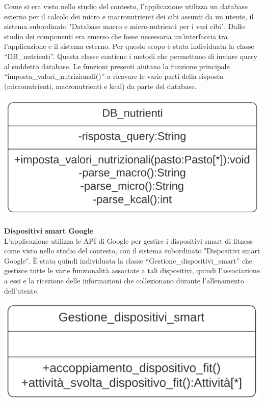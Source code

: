 \documentclass{article}
\begin{document}
      Come si era visto nello studio del contesto, l’applicazione utilizza un database esterno per il calcolo dei micro e macronutrienti dei cibi assunti da un utente, il sistema subordinato "Database macro e micro-nutrienti per i vari cibi". Dallo studio dei componenti era emerso che fosse necessaria un’interfaccia tra l’applicazione e il sistema esterno. Per questo scopo è stata individuata la classe “DB\_nutrienti”. Questa classe contiene i metodi che permettono di inviare query al suddetto database. Le funzioni presenti aiutano la funzione principale “imposta\_valori\_nutrizionali()” a ricavare le varie parti della risposta (micronutrienti, macronutrienti e kcal) da parte del database.\\
      \begin{center}
            \includegraphics[scale=0.5]{classi/DB_nutrienti.png}
      \end{center}

      {\large\textbf{Dispositivi smart Google}}\\

      L’applicazione utilizza le API di Google per gestire i dispositivi smart di fitness come visto nello studio del contesto, con il sistema subordinato "Dispositivi smart Google". È stata quindi individuata la classe “Gestione\_dispositivi\_smart” che gestisce tutte le varie funzionalità associate a tali dispositivi, quindi l’associazione a essi e la ricezione delle informazioni che collezionano durante l’allenamento dell’utente.\\
      \begin{center}
            \includegraphics[scale=0.5]{classi/Gestione_dispositivi_smart.png}
      \end{center}
\end{document}
